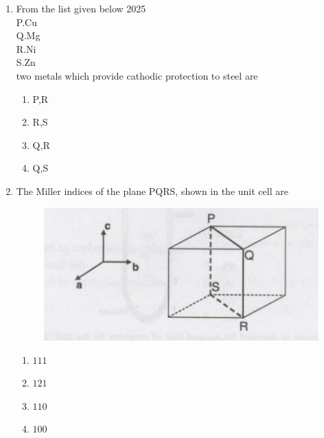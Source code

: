 \documentclass[journal]{IEEEtran}
\theoremstyle{remark}
\begin{document}
\begin{enumerate}
\begin{figure}[h]
    \label{fig:placeholder}
\end{figure}
\begin{multicols}{4}
\begin{enumerate}
    \item M1
    \item M2
    \item M3
    \item M4
\end{enumerate}
\end{multicols}
\item From the list given below 2025\\
P.Cu\\
Q.Mg\\
R.Ni\\
S.Zn\\
two metals which provide cathodic protection to steel are\hfill{}
\begin{multicols}{4}
\begin{enumerate}
    \item P,R
    \item R,S
    \item Q,R
    \item Q,S
\end{enumerate}
    
\end{multicols}


\item The Miller indices of the plane PQRS, shown in the unit cell are\hfill{}
\begin{figure}[h]
    \centering
    \includegraphics[width=0.5\linewidth]{figs/Q.14.png}
    \label{fig:placeholder}
\end{figure}
\begin{multicols}{4}
\begin{enumerate}
\item $111$
\item$121$
\item $110$
\item $100$
\end{enumerate}
\end{multicols}


\end{enumerate}
\end{document}
